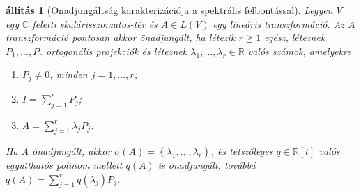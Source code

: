 \documentclass[9pt, a4paper, showtrims]{memoir}
\theoremstyle{plain}
\newtheorem{proposition}{állítás}[chapter]
\theoremstyle{remark}
\theoremstyle{definition}
\begin{document}
\begin{proposition}[Önadjungáltság karakterizációja a spektrális felbontással]
	Legyen $V$ egy $\mathbb{C}$ feletti ska\-lá\-ris\-szor\-za\-tos-tér és $A\in L\left( V \right)$ egy lineáris transzformáció.
	Az $A$ transzformáció pontosan akkor önadjungált,
	ha létezik $r\geq 1$ egész, léteznek $P_1,\ldots,P_r$ ortogonális projekciók és
	léteznek $\lambda_1,\ldots,\lambda_r\in\mathbb{R}$ valós számok,
	amelyekre
	\begin{enumerate}
		\item $P_j\neq 0$, minden $j=1,\ldots,r$;
		\item $I=\sum_{j=1}^rP_j$;
		\item $A=\sum_{j=1}^r\lambda_jP_j$.
	\end{enumerate}
	Ha $A$ önadjungált,
	akkor $\sigma\left( A \right)=\left\{ \lambda_1,\ldots,\lambda_r \right\}$,
	és tetszőleges $q\in\mathbb{R}[t]$ valós együtthatós polinom mellett
	$q\left( A \right)$ is önadjungált,
	továbbá
	$q\left( A \right)=\sum_{j=1}^rq\left( \lambda_j \right)P_j$.
\end{proposition}
\end{document}
